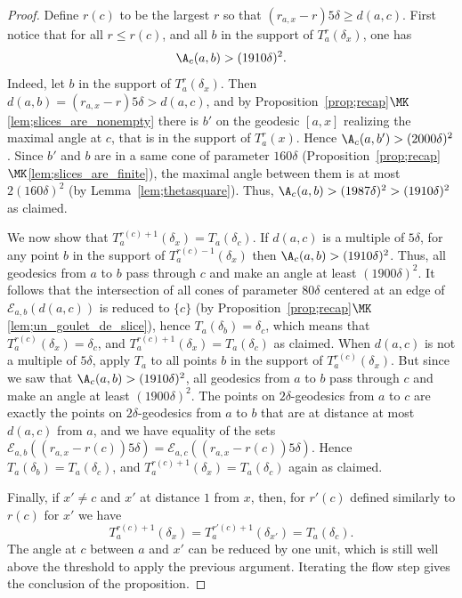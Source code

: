 \begin{proof}
Define $r(c)$ to be the largest $r$ so that $(r_{a,x} -r)5\delta\geq d(a,c)$. First notice that for all $r\leq r(c)$, and all $b$ in the support of $ T^r_a(\delta_x) $, one has
\[
\A_c(a,b)>(1910\delta)^2.
\]
Indeed, let $b$ in the support of $ T^r_a(\delta_x) $. Then $d(a,b) = (r_{a,x} -r)5\delta >d(a,c)$, and by Proposition~\ref{prop;recap}$\MK$\eqref{lem;slices_are_nonempty} there is $b'$ on the geodesic $[a,x]$ realizing the maximal angle at $c$, that is in the support of $ T^r_a(x) $. Hence $\A_c(a,b') >(2000\delta)^2$. Since $b'$ and $b$ are in a same cone of parameter $160\delta$ (Proposition~\ref{prop;recap}$\MK$\eqref{lem;slices_are_finite}), the maximal angle between them is at most $2(160\delta)^2$ (by Lemma~\ref{lem;thetasquare}). Thus, $\A_c(a,b)>(1987\delta)^2>(1910\delta)^2$ as claimed.

We now show that $T^{r(c)+1}_a(\delta_x)=T_a(\delta_c)$. If $d(a,c)$ is a multiple of $5\delta$, for any point $b$ in the support of $ T^{r(c)-1}_a(\delta_x)$ then $\A_c(a,b)>(1910\delta)^2$. Thus, all geodesics from $a$ to $b$ pass through $c$ and make an angle at least $(1900\delta)^2$. It follows that the intersection of all cones of parameter $80\delta$ centered at an edge of $\mathcal{E}_{a,b}(d(a,c))$ is reduced to $\{c\}$ (by Proposition~\ref{prop;recap}$\MK$\eqref{lem;un_goulet_de_slice}), hence $T_a(\delta_b) = \delta_c$, which means that $T^{r(c)}_a(\delta_x) = \delta_c$, and $T^{r(c)+1}_a(\delta_x)=T_a(\delta_c)$ as claimed. When $d(a,c)$ is not a multiple of $5\delta$, apply $T_a$ to all points $b$ in the support of $ T^{r(c)}_a(\delta_x) $. But since we saw that $\A_c(a,b)>(1910\delta)^2$, all geodesics from $a$ to $b$ pass through $c$ and make an angle at least $(1900\delta)^2$. The points on $2\delta$-geodesics from $a$ to $c$ are exactly the points on $2\delta$-geodesics from $a$ to $b$ that are at distance at most $d(a,c)$ from $a$, and we have equality of the sets $\mathcal{E}_{a,b}((r_{a,x}- r(c))5\delta)=\mathcal{E}_{a,c}((r_{a,x}- r(c))5\delta)$. Hence $T_a(\delta_b) = T_a(\delta_c)$, and $T^{r(c)+1}_a(\delta_x)=T_a(\delta_c)$ again as claimed.

Finally, if $x'\neq c$ and $x'$ at distance $1$ from $x$, then, for $r'(c)$ defined similarly to $r(c)$ for $x'$ we have
\[
T^{r(c)+1}_a(\delta_x) = T^{r'(c)+1}_a(\delta_{x'}) = T_a(\delta_c).
\]
The angle at $c$ between $a$ and $x'$ can be reduced by one unit, which is still well above the threshold to apply the previous argument. Iterating the flow step gives the conclusion of the proposition.
\end{proof}

